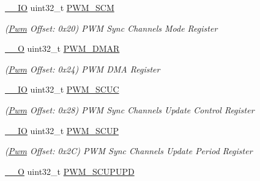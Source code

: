 \begin{DoxyCompactItemize}
\mbox{\label{structPwm_a4af7499a8a8c38dc36a90f07838c235c}} 
\mbox{\hyperlink{core__cm7_8h_aec43007d9998a0a0e01faede4133d6be}{\+\_\+\+\_\+\+IO}} uint32\+\_\+t \mbox{\hyperlink{structPwm_a4af7499a8a8c38dc36a90f07838c235c}{P\+W\+M\+\_\+\+S\+CM}}
\begin{DoxyCompactList}\small\item\em (\mbox{\hyperlink{structPwm}{Pwm}} Offset\+: 0x20) P\+WM Sync Channels Mode Register \end{DoxyCompactList}\item 
\mbox{\label{structPwm_aad190db63b9c3c51d3a40856f3925aeb}} 
\mbox{\hyperlink{core__cm7_8h_a7e25d9380f9ef903923964322e71f2f6}{\+\_\+\+\_\+O}} uint32\+\_\+t \mbox{\hyperlink{structPwm_aad190db63b9c3c51d3a40856f3925aeb}{P\+W\+M\+\_\+\+D\+M\+AR}}
\begin{DoxyCompactList}\small\item\em (\mbox{\hyperlink{structPwm}{Pwm}} Offset\+: 0x24) P\+WM D\+MA Register \end{DoxyCompactList}\item 
\mbox{\label{structPwm_a531917d3f450f7ad0d55e8a2106906fe}} 
\mbox{\hyperlink{core__cm7_8h_aec43007d9998a0a0e01faede4133d6be}{\+\_\+\+\_\+\+IO}} uint32\+\_\+t \mbox{\hyperlink{structPwm_a531917d3f450f7ad0d55e8a2106906fe}{P\+W\+M\+\_\+\+S\+C\+UC}}
\begin{DoxyCompactList}\small\item\em (\mbox{\hyperlink{structPwm}{Pwm}} Offset\+: 0x28) P\+WM Sync Channels Update Control Register \end{DoxyCompactList}\item 
\mbox{\label{structPwm_af45588bc983b3bd8b68feae558217f4f}} 
\mbox{\hyperlink{core__cm7_8h_aec43007d9998a0a0e01faede4133d6be}{\+\_\+\+\_\+\+IO}} uint32\+\_\+t \mbox{\hyperlink{structPwm_af45588bc983b3bd8b68feae558217f4f}{P\+W\+M\+\_\+\+S\+C\+UP}}
\begin{DoxyCompactList}\small\item\em (\mbox{\hyperlink{structPwm}{Pwm}} Offset\+: 0x2C) P\+WM Sync Channels Update Period Register \end{DoxyCompactList}\item 
\mbox{\label{structPwm_a7f5c3823fd1fd2427eefee31fd075e8e}} 
\mbox{\hyperlink{core__cm7_8h_a7e25d9380f9ef903923964322e71f2f6}{\+\_\+\+\_\+O}} uint32\+\_\+t \mbox{\hyperlink{structPwm_a7f5c3823fd1fd2427eefee31fd075e8e}{P\+W\+M\+\_\+\+S\+C\+U\+P\+U\+PD}}

\end{DoxyCompactItemize}
